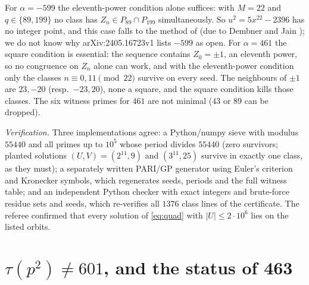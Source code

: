 \begin{remark}\label{rem:which}
For $\alpha=-599$ the eleventh-power condition alone suffices: with $M=22$ and $q\in\{89,199\}$ no class has $Z_n\in P_{89}\cap P_{199}$ simultaneously. So $u^2=5x^{22}-2396$ has no integer point, and this case falls to the method of \cite[Lemma~2.15]{Goto} (due to Dembner and Jain \cite{DJ}); we do not know why arXiv:2405.16723v1 lists $-599$ as open. For $\alpha=461$ the square condition is essential: the sequence contains $Z_0=\pm1$, an eleventh power, so no congruence on $Z_n$ alone can work, and with the eleventh-power condition only the classes $n\equiv0,11\pmod{22}$ survive on every seed. The neighbours of $\pm1$ are $23,-20$ (resp.\ $-23,20$), none a square, and the square condition kills those classes. The six witness primes for $461$ are not minimal ($43$ or $89$ can be dropped).
\end{remark}

\emph{Verification.} Three implementations agree: a Python/numpy sieve with modulus $55440$ and all primes up to $10^5$ whose period divides $55440$ (zero survivors; planted solutions $(U,V)=(2^{11},9)$ and $(3^{11},25)$ survive in exactly one class, as they must); a separately written PARI/GP generator using Euler's criterion and Kronecker symbols, which regenerates seeds, periods and the full witness table; and an independent Python checker with exact integers and brute-force residue sets and seeds, which re-verifies all $1376$ class lines of the certificate. The referee confirmed that every solution of \eqref{eq:quad} with $|U|\le2\cdot10^6$ lies on the listed orbits.

\section{\texorpdfstring{$\tau(p^2)\ne601$}{tau(p\^{}2) is not 601}, and the status of 463}\label{sec:p2}

